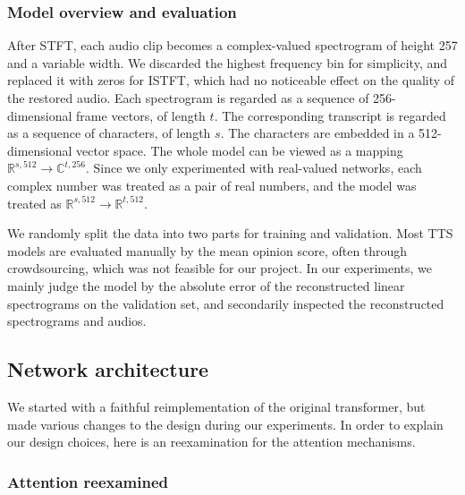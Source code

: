 \documentclass[11pt]{article}
\begin{document}
\subsubsection*{Model overview and evaluation}%
\label{ssec:evaluation}

After STFT, each audio clip becomes a complex-valued spectrogram of height 257 and a variable width.
We discarded the highest frequency bin for simplicity,
and replaced it with zeros for ISTFT,
which had no noticeable effect on the quality of the restored audio.
Each spectrogram is regarded as a sequence of 256-dimensional frame vectors, of length \(t\).
The corresponding transcript is regarded as a sequence of characters, of length \(s\).
The characters are embedded in a 512-dimensional vector space.
The whole model can be viewed as a mapping \(\mathbb{R}^{s,512} \to \mathbb{C}^{t,256}\).
Since we only experimented with real-valued networks,
each complex number was treated as a pair of real numbers,
and the model was treated as \(\mathbb{R}^{s,512} \to \mathbb{R}^{t,512}\).

We randomly split the data into two parts for training and validation.
Most TTS models are evaluated manually by the mean opinion score,
often through crowdsourcing,
which was not feasible for our project.
In our experiments,
we mainly judge the model by the absolute error of the reconstructed linear spectrograms on the validation set,
and secondarily inspected the reconstructed spectrograms and audios.

\subsection{Network architecture}\label{sec:architecture}

We started with a faithful reimplementation of the original transformer,
but made various changes to the design during our experiments.
In order to explain our design choices,
here is an reexamination for the attention mechanisms.

\subsubsection*{Attention reexamined}
\end{document}

